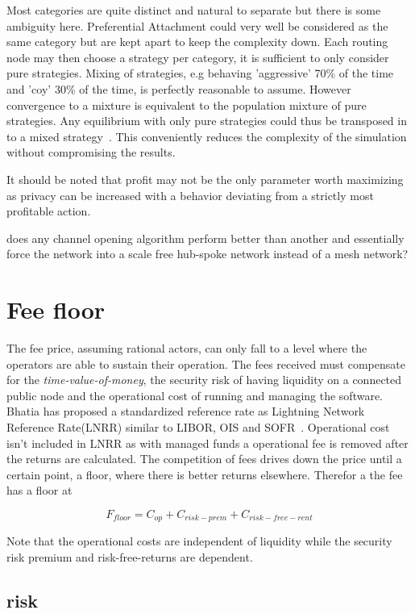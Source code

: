 Most categories are quite distinct and natural to separate but there is some ambiguity here. Preferential Attachment could very well be considered as the same category but are kept apart to keep the complexity down. Each routing node may then choose a strategy per category, it is sufficient to only consider pure strategies. Mixing of strategies, e.g behaving 'aggressive' 70\% of the time and 'coy' 30\% of the time, is perfectly reasonable to assume. However convergence to a mixture is equivalent to the population mixture of pure strategies. Any equilibrium with only pure strategies could thus be transposed in to a mixed strategy~\cite{easly:kleinberg:network:crowds:markets}. This conveniently reduces the complexity of the simulation without compromising the results. 


It should be noted that profit may not be the only parameter worth maximizing as privacy can be increased with a behavior deviating from a strictly most profitable action.   

does any channel opening algorithm perform better than another and essentially force the network into a scale free hub-spoke network instead of a mesh network?

\section{Fee floor}

The fee price, assuming rational actors, can only fall to a level where the operators are able to sustain their operation. The fees received must compensate for the \textit{time-value-of-money}, the security risk of having liquidity on a connected public node and the operational cost of running and managing the software. Bhatia has proposed a standardized reference rate as Lightning Network Reference Rate(LNRR) similar to LIBOR, OIS and SOFR~\cite{bhatia:time:value}. Operational cost isn't included in LNRR as with managed funds a  operational fee is removed after the returns are calculated. The competition of fees drives down the price until a certain point, a floor, where there is better returns elsewhere. Therefor a the fee has a floor at

\[ F_{floor} = C_{op} + C_{risk-prem} + C_{risk-free-rent} \]

Note that the operational costs are independent of liquidity while the security risk premium and risk-free-returns are dependent.

\subsection{risk}

